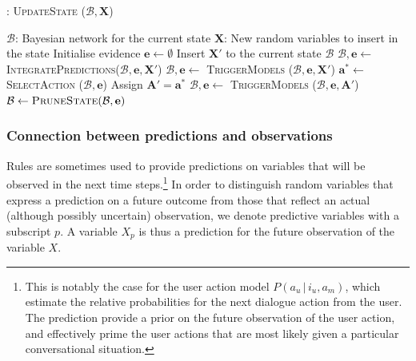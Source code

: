 \begin{algorithm}[h]
\caption{: \textsc{UpdateState} ($\mathcal{B}, \mathbf{X}$)}
\begin{algorithmic}[1] \vspace{1mm}
\REQUIRE $\mathcal{B}$: Bayesian network for the current state
\REQUIRE $\mathbf{X}$: New random variables to insert in the state \vspace{1mm}
\STATE Initialise evidence $\mathbf{e} \leftarrow \emptyset$
\STATE Insert $\mathbf{X}'$ to the current state $\mathcal{B}$ 
\STATE $\mathcal{B}, \mathbf{e} \leftarrow $ \textsc{IntegratePredictions}($\mathcal{B}, \mathbf{e}, \mathbf{X}'$)
\STATE $\mathcal{B}, \mathbf{e} \leftarrow$ \textsc{TriggerModels} ($\mathcal{B}, \mathbf{e},  \mathbf{X}'$) \vspace{1mm}
\STATE $\mathbf{a}^* \leftarrow $ \textsc{SelectAction} ($\mathcal{B}, \mathbf{e}$)
\STATE Assign $\mathbf{A}' = \mathbf{a}^*$
\STATE $\mathcal{B}, \mathbf{e} \leftarrow$ \textsc{TriggerModels} ($\mathcal{B}, \mathbf{e}, \mathbf{A}'$)
\ENDWHILE \vspace{1mm}
\STATE $\mathcal{B} \leftarrow \textsc{PruneState} (\mathcal{B}, \mathbf{e})$ \vspace{1mm}
\end{algorithmic}
\label{algo:stateupdate}
\end{algorithm}

\subsubsection*{Connection between predictions and observations}

Rules are sometimes used to provide predictions on variables that will be observed in the next time steps.\footnote{This is notably the case for the user action model $P(a_u \, | \, i_u, a_m)$, which estimate the relative probabilities for the next dialogue action from the user. The prediction provide a prior on the future observation of the user action, and effectively prime the user actions that are most likely given a particular conversational situation.} In order to distinguish random variables that express a prediction on a future outcome from those that reflect an actual (although possibly uncertain) observation, we denote predictive variables with a subscript $p$. A variable $X_p$ is thus a prediction for the future observation of the variable $X$. 

